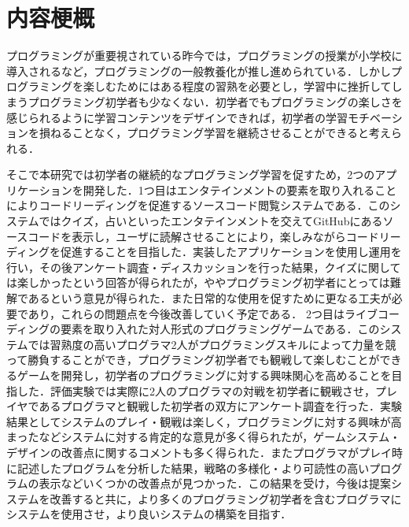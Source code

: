 \section*{内容梗概}

プログラミングが重要視されている昨今では，プログラミングの授業が小学校に導入されるなど，プログラミングの一般教養化が推し進められている．しかしプログラミングを楽しむためにはある程度の習熟を必要とし，学習中に挫折してしまうプログラミング初学者も少なくない．初学者でもプログラミングの楽しさを感じられるように学習コンテンツをデザインできれば，初学者の学習モチベーションを損ねることなく，プログラミング学習を継続させることができると考えられる．

そこで本研究では初学者の継続的なプログラミング学習を促すため，2つのアプリケーションを開発した．1つ目はエンタテインメントの要素を取り入れることによりコードリーディングを促進するソースコード閲覧システムである．このシステムではクイズ，占いといったエンタテインメントを交えてGitHubにあるソースコードを表示し，ユーザに読解させることにより，楽しみながらコードリーディングを促進することを目指した．実装したアプリケーションを使用し運用を行い，その後アンケート調査・ディスカッションを行った結果，クイズに関しては楽しかったという回答が得られたが，ややプログラミング初学者にとっては難解であるという意見が得られた．また日常的な使用を促すために更なる工夫が必要であり，これらの問題点を今後改善していく予定である．
2つ目はライブコーディングの要素を取り入れた対人形式のプログラミングゲームである．このシステムでは習熟度の高いプログラマ2人がプログラミングスキルによって力量を競って勝負することができ，プログラミング初学者でも観戦して楽しむことができるゲームを開発し，初学者のプログラミングに対する興味関心を高めることを目指した．評価実験では実際に2人のプログラマの対戦を初学者に観戦させ，プレイヤであるプログラマと観戦した初学者の双方にアンケート調査を行った．実験結果としてシステムのプレイ・観戦は楽しく，プログラミングに対する興味が高まったなどシステムに対する肯定的な意見が多く得られたが，ゲームシステム・デザインの改善点に関するコメントも多く得られた．またプログラマがプレイ時に記述したプログラムを分析した結果，戦略の多様化・より可読性の高いプログラムの表示などいくつかの改善点が見つかった．この結果を受け，今後は提案システムを改善すると共に，より多くのプログラミング初学者を含むプログラマにシステムを使用させ，より良いシステムの構築を目指す．